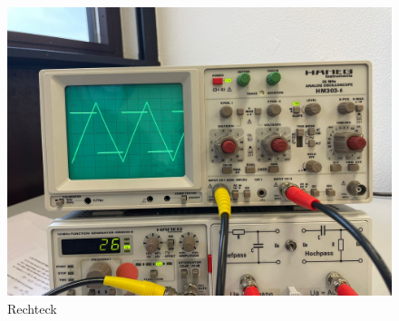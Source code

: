 \begin{figure}
  
  \centering
  \includegraphics[scale=0.1]{content/rechteckInt.png}
  \caption{Rechteck}
  \label{fig:abb10}
\end{figure}
